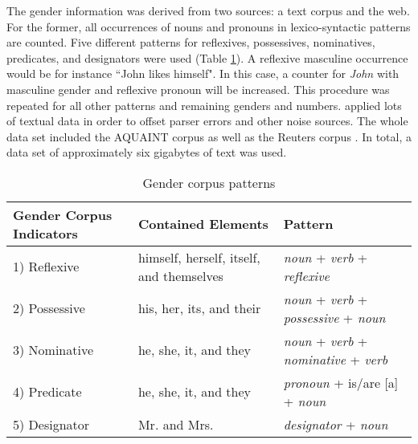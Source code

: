 The gender information was derived from two sources: a text corpus and the web. 
For the former, all occurrences of nouns and pronouns in lexico-syntactic patterns are counted. Five different patterns for reflexives, possessives, nominatives, predicates, and designators were used (Table \ref{table:bergsma2004GenderTable}). A reflexive masculine occurrence would be for instance ``John likes himself". In this case, a counter for \textit{John} with masculine gender and reflexive pronoun will be increased. This procedure was repeated for all other patterns and remaining genders and numbers. \cite{bergsma2005automatic} applied lots of textual data in order to offset parser errors and other noise sources. The whole data set included the AQUAINT corpus \citep{graff2002aquaint} as well as the Reuters corpus \citep{rose2002reuters}. In total, a data set of approximately six gigabytes of text was used.

\begin{table}[h]
  \caption{Gender corpus patterns}
    \begin{tabular}{| l | p{5cm} | p{5cm} |}
    \hline
    Gender Corpus Indicators & Contained Elements & Pattern \\ \hline
\hline
    1) Reflexive & himself, herself, itself, and themselves &  \textit{noun} + \textit{verb} + \textit{reflexive}\\ \hline
    2) Possessive & his, her, its, and their & \textit{noun} + \textit{verb} + \textit{possessive} + \textit{noun} \\ \hline
    3) Nominative & he, she, it, and they & \textit{noun} + \textit{verb} + \textit{nominative} +  \textit{verb} \\ \hline
    4) Predicate & he, she, it, and they & \textit{pronoun} + is/are [a] + \textit{noun}  \\ \hline
    5) Designator & Mr. and Mrs. & \textit{designator} + \textit{noun}\\ \hline
    \end{tabular}

     \label{table:bergsma2004GenderTable}
\end{table}

